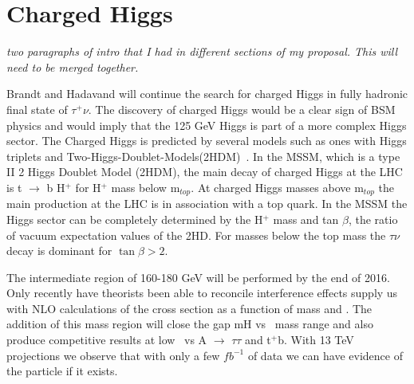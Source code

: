 \section{Charged Higgs}
\label{chargedHiggs}
{\it two paragraphs of intro that I had in different sections of my proposal.  This will need to be merged together.}

Brandt and Hadavand will continue the search for charged Higgs in fully hadronic final state of $\tau^+ \nu$.  The discovery of charged Higgs  would be a clear sign of BSM physics 
and would imply that the 125 GeV Higgs is part of a more complex Higgs sector. 
The Charged Higgs is predicted by several models such as ones with Higgs triplets and Two-Higgs-Doublet-Models(2HDM)~\cite{2hdm1,2hdm2,2hdm3}. 
In the MSSM, which is a type II 2 Higgs Doublet Model (2HDM), the main decay of charged Higgs at the LHC is t $\rightarrow$ b H$^+$ for H$^+$ mass below m$_{top}$. At charged Higgs masses above m$_{top}$
the main production at the LHC is in association with a top quark.  In the MSSM the Higgs sector can be completely determined by the H$^+$ mass and tan $\beta$, the ratio of vacuum expectation values of the 2HD.
For masses below the top mass the $\tau \nu$ decay is dominant for $\tan \beta >2 $. 


The intermediate region of 160-180 GeV will be performed by the end of 2016.  Only recently have theorists been able to reconcile \ttbar interference effects supply us with NLO  calculations of the cross section as a function of mass and \tanb.
The addition of this mass region will close the gap mH vs \tanb\ mass range and also produce competitive results at low \tanb\ vs A $\rightarrow$ $\tau \tau$ and \Hp \too t$^+$b.  With 13 TeV projections we observe that with only a few $fb^{-1}$ of data we can have evidence of the particle if it exists.

